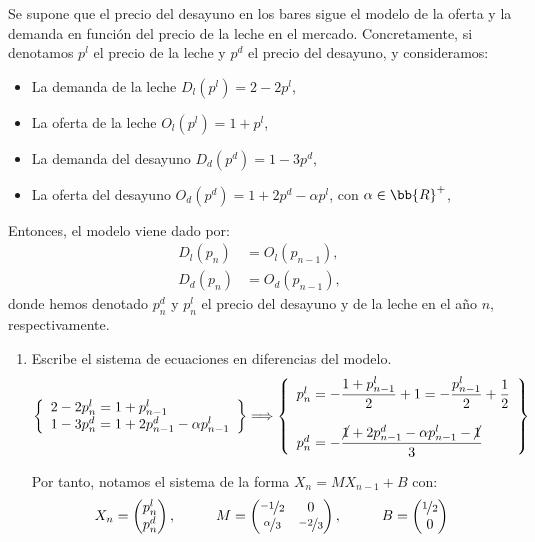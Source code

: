 \begin{ejercicio}
Se supone que el precio del desayuno en los bares sigue el modelo de la oferta y la demanda en función del precio de la leche en el mercado. Concretamente, si denotamos $p^l$ el precio de la leche y $p^d$ el precio del desayuno, y consideramos:
\begin{itemize}
    \item La demanda de la leche $D_l(p^l) = 2 - 2p^l$,
    \item La oferta de la leche $O_l(p^l) = 1 + p^l$,
    \item La demanda del desayuno $D_d(p^d) = 1 - 3p^d$,
    \item La oferta del desayuno $O_d(p^d) = 1 + 2p^d - \alpha p^l$, con $\alpha\in \bb{R}^+$,
\end{itemize}

Entonces, el modelo viene dado por:
\begin{align*}
D_l(p_n) &= O_l(p_{n-1}),\\
D_d(p_n) &= O_d(p_{n-1}),
\end{align*}
donde hemos denotado $p^d_n$ y $p^l_n$ el precio del desayuno y de la leche en el año $n$, respectivamente.
\begin{enumerate}
    \item Escribe el sistema de ecuaciones en diferencias del modelo.
    \begin{equation*}
        \left\{
            \begin{array}{l}
                2-2p_n^l = 1+p_{n-1}^l\\
                1-3p_n^d = 1+2p_{n-1}^d - \alpha p_{n-1}^l
            \end{array}
        \right\}
        \Longrightarrow
        \left\{
            \begin{array}{l}
                p_n^l = -\dfrac{1+p_{n-1}^l}{2}+1 = -\dfrac{p_{n-1}^l}{2} + \dfrac{1}{2}
                \\ \\
                p_n^d = -\dfrac{\cancel{1}+2p_{n-1}^d - \alpha p_{n-1}^l -\cancel{1}}{3}
            \end{array}
        \right\}
    \end{equation*}

    Por tanto, notamos el sistema de la forma $X_n=MX_{n-1}+B$ con:
    \begin{equation*}
        X_n = \begin{pmatrix}
            p_n^l\\
            p_n^d
        \end{pmatrix},\hspace{1cm}
        M = \begin{pmatrix}
            \nicefrac{-1}{2} & 0\\
            \nicefrac{\alpha}{3} & \nicefrac{-2}{3}
        \end{pmatrix},\hspace{1cm}
        B = \begin{pmatrix}
            \nicefrac{1}{2}\\
            0
        \end{pmatrix}
    \end{equation*}


\end{enumerate}
\end{ejercicio}
